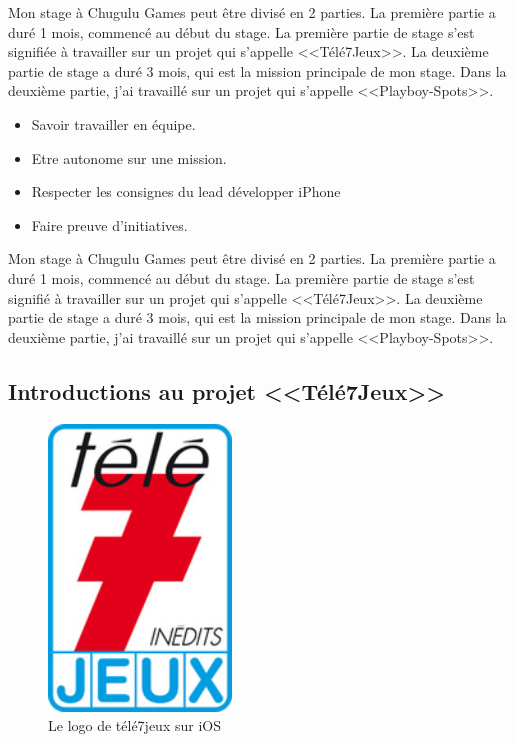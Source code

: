 Mon stage à Chugulu Games peut être divisé en 2 parties. La première partie a duré 1 mois, commencé au début du stage. La première partie de stage s'est signifiée à travailler sur un projet qui s'appelle <<Télé7Jeux>>. La deuxième partie de stage a duré 3 mois, qui est la mission principale de mon stage. Dans la deuxième partie, j'ai travaillé sur un projet qui s'appelle <<Playboy-Spots>>.
\begin{itemize}  \item Savoir travailler en équipe.


\item Etre autonome sur une mission.

\item Respecter les consignes du lead développer iPhone  \item Faire preuve d'initiatives.
\end{itemize}


Mon stage à Chugulu Games peut être divisé en 2 parties. La première partie a duré 1 mois, commencé au début du stage. La première partie de stage s'est signifié à travailler sur un projet qui s'appelle <<Télé7Jeux>>. La deuxième partie de stage a duré 3 mois, qui est la mission principale de mon stage. Dans la deuxième partie, j'ai travaillé sur un projet qui s'appelle <<Playboy-Spots>>.


\subsection{Introductions au projet <<Télé7Jeux>>} %

\begin{figure}[htbp]
	\centering
		\includegraphics[height=3in]{Image/tele_7_jeux_logo_lien_logo.jpg}
	\caption{Le logo de télé7jeux sur iOS}
	\label{fig:Image_tele_7_jeux_logo_lien_logo}
\end{figure}


